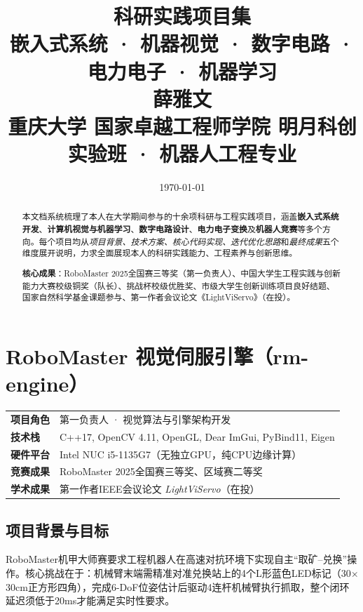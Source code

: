 \documentclass[12pt,a4paper]{ctexart}
\title{%
    \vspace{-1cm}
    {\Huge\bfseries 科研实践项目集}\\[0.5em]
    {\Large\color{sectionblue} 嵌入式系统 · 机器视觉 · 数字电路 · 电力电子 · 机器学习}\\[1em]
    {\large 薛雅文}\\[0.3em]
    {\normalsize 重庆大学 国家卓越工程师学院 明月科创实验班 · 机器人工程专业}
}
\date{\today}
\author{}
\begin{document}
\maketitle
\thispagestyle{fancy}

\begin{abstract}
本文档系统梳理了本人在大学期间参与的十余项科研与工程实践项目，涵盖\textbf{嵌入式系统开发}、\textbf{计算机视觉与机器学习}、\textbf{数字电路设计}、\textbf{电力电子变换}及\textbf{机器人竞赛}等多个方向。每个项目均从\textit{项目背景、技术方案、核心代码实现、迭代优化思路}和\textit{最终成果}五个维度展开说明，力求全面展现本人的科研实践能力、工程素养与创新思维。

\noindent\textbf{核心成果}：RoboMaster 2025全国赛三等奖（第一负责人）、中国大学生工程实践与创新能力大赛校级铜奖（队长）、挑战杯校级优胜奖、市级大学生创新训练项目良好结题、国家自然科学基金课题参与、第一作者会议论文《LightViServo》（在投）。
\end{abstract}

\tableofcontents
\newpage

\section{RoboMaster 视觉伺服引擎（rm-engine）}

\begin{infobox}[项目概况]
\begin{tabular}{ll}
\textbf{项目角色} & 第一负责人 · 视觉算法与引擎架构开发 \\
\textbf{技术栈}   & C++17, OpenCV 4.11, OpenGL, Dear ImGui, PyBind11, Eigen \\
\textbf{硬件平台} & Intel NUC i5-1135G7（无独立GPU，纯CPU边缘计算） \\
\textbf{竞赛成果} & RoboMaster 2025全国赛三等奖、区域赛二等奖 \\
\textbf{学术成果} & 第一作者IEEE会议论文 \textit{LightViServo}（在投）
\end{tabular}
\end{infobox}

\subsection{项目背景与目标}

RoboMaster机甲大师赛要求工程机器人在高速对抗环境下实现自主``取矿--兑换''操作。核心挑战在于：机械臂末端需精准对准兑换站上的4个L形蓝色LED标记（30$\times$30cm正方形四角），完成6-DoF位姿估计后驱动4连杆机械臂执行抓取，整个闭环延迟须低于20ms才能满足实时性要求。
\end{document}
